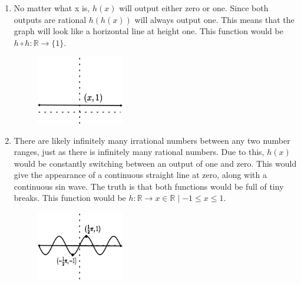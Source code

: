 \documentclass{article}
\begin{document}
\begin{enumerate}
\begin{enumerate}
                    \pagebreak

              \item No matter what x is, $h(x)$ will output either zero or one. Since both outputs are rational $h(h(x))$ will always output one. This means that the graph will look like a horizontal line at height one. This function would be $h \circ h \colon \mathbb{R} \longrightarrow \{1\}$.
              \begin{figure}[h]\centering\includegraphics[width=1.5in]{line}\end{figure}



              \item There are likely infinitely many irrational numbers between any two number ranges, just as there is infinitely many rational numbers. Due to this, $h(x)$ would be constantly switching between an output of one and zero. This would give the appearance of a continuous straight line at zero, along with a continuous sin wave. The truth is that both functions would be full of tiny breaks. This function would be $h \colon \mathbb{R} \longrightarrow x \in \mathbb{R} \mid -1 \leq x \leq 1$.
              \begin{figure}[h]\centering\includegraphics[width=1.5in]{sin}\end{figure}

      \end{enumerate}
\end{enumerate}
\end{document}
